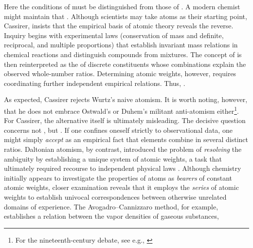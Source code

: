 \documentclass[submitted,12pt]{article}
\begin{document}
Here the conditions of  must be distinguished from those of  . A modern chemist might maintain that  . Although scientists may take atoms as their starting point, Cassirer, insists that the empirical basis of atomic theory reveals the reverse. Inquiry begins with experimental laws (conservation of mass and definite, reciprocal, and multiple proportions) that establish invariant mass relations in chemical reactions and distinguish compounds from mixtures. The concept of  is then reinterpreted as the  of discrete constituents whose combinations explain the observed whole-number ratios. Determining atomic weights, however, requires coordinating further independent empirical relations. Thus,  .

As expected, Cassirer rejects Wurtz's naive atomism. It is worth noting, however, that he does not embrace Ostwald's or Duhem's militant anti-atomism either\footnote{For the nineteenth-century debate, see e.g., \citet{Rocke1984}}. For Cassirer, the alternative itself is ultimately misleading. The decisive question concerns not , but  . If one confines oneself strictly to observational data, one might simply \emph{accept} as an empirical fact that elements combine in several distinct ratios. Daltonian atomism, by contrast, introduced the problem of \emph{resolving} the ambiguity by establishing a unique system of atomic weights, a task that ultimately required recourse to independent physical laws \cite[see][lect.~IV]{Ladenburg1902}. Although chemistry initially appears to investigate the properties of atoms as \emph{bearers} of constant atomic weights, closer examination reveals that it employs the \emph{series} of atomic weights to establish univocal correspondences between otherwise unrelated domains of experience. The Avogadro--Cannizzaro method, for example, establishes a relation between the vapor densities of gaseous substances,
\end{document}

